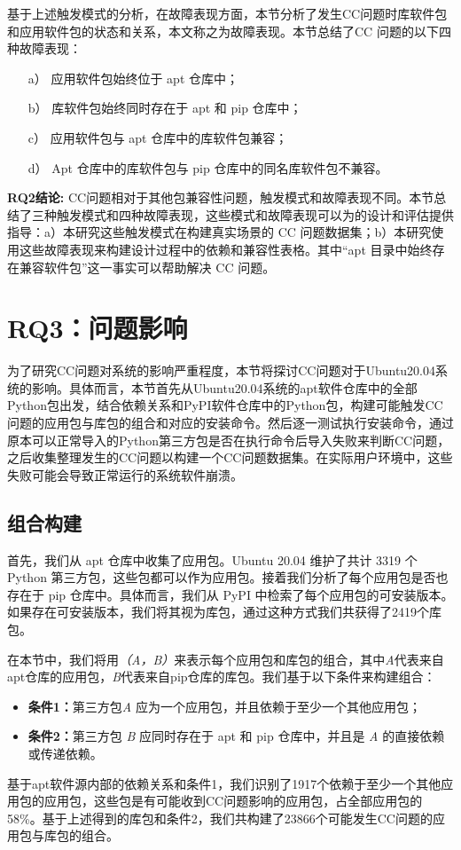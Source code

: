 基于上述触发模式的分析，在故障表现方面，本节分析了发生CC问题时库软件包和应用软件包的状态和关系，本文称之为故障表现。本节总结了CC 问题的以下四种故障表现：
\begin{itemize}
	\item[a）] 应用软件包始终位于 apt 仓库中；
	\item[b）] 库软件包始终同时存在于 apt 和 pip 仓库中；
	\item[c）] 应用软件包与 apt 仓库中的库软件包兼容；
	\item[d）] Apt 仓库中的库软件包与 pip 仓库中的同名库软件包不兼容。
\end{itemize}


\begin{tcolorbox}[boxrule=1pt,boxsep=1pt,left=2pt,right=2pt,top=2pt,bottom=2pt]
	\small
	\textcolor{red}{} \noindent\textbf{RQ2结论:} 
	CC问题相对于其他包兼容性问题，触发模式和故障表现不同。本节总结了三种触发模式和四种故障表现，这些模式和故障表现可以为\tool{}的设计和评估提供指导：a）本研究这些触发模式在构建真实场景的 CC 问题数据集；b）本研究使用这些故障表现来构建\tool{}设计过程中的依赖和兼容性表格。其中“apt 目录中始终存在兼容软件包”这一事实可以帮助\tool{}解决 CC 问题。
\end{tcolorbox} 

\section{RQ3：问题影响}\label{3.4}
为了研究CC问题对系统的影响严重程度，本节将探讨CC问题对于Ubuntu20.04系统的影响。具体而言，本节首先从Ubuntu20.04系统的apt软件仓库中的全部Python包出发，结合依赖关系和PyPI软件仓库中的Python包，构建可能触发CC问题的应用包与库包的组合和对应的安装命令。然后逐一测试执行安装命令，通过原本可以正常导入的Python第三方包是否在执行命令后导入失败来判断CC问题，之后收集整理发生的CC问题以构建一个CC问题数据集。在实际用户环境中，这些失败可能会导致正常运行的系统软件崩溃。

\subsection{组合构建}
首先，我们从 apt 仓库中收集了应用包。Ubuntu 20.04 维护了共计 3319 个 Python 第三方包，这些包都可以作为应用包。接着我们分析了每个应用包是否也存在于 pip 仓库中。具体而言，我们从 PyPI 中检索了每个应用包的可安装版本。如果存在可安装版本，我们将其视为库包，通过这种方式我们共获得了2419个库包。

在本节中，我们将用\textit{（A，B）}来表示每个应用包和库包的组合，其中\textit{A}代表来自apt仓库的应用包，\textit{B}代表来自pip仓库的库包。我们基于以下条件来构建组合：
\begin{itemize}
	\item \textbf{条件1：}第三方包\textit{A} 应为一个应用包，并且依赖于至少一个其他应用包；
	\item \textbf{条件2：}第三方包 \textit{B} 应同时存在于 apt 和 pip 仓库中，并且是 \textit{A} 的直接依赖或传递依赖。
\end{itemize}
基于apt软件源内部的依赖关系和条件1，我们识别了1917个依赖于至少一个其他应用包的应用包，这些包是有可能收到CC问题影响的应用包，占全部应用包的58\%。基于上述得到的库包和条件2，我们共构建了23866个可能发生CC问题的应用包与库包的组合。

